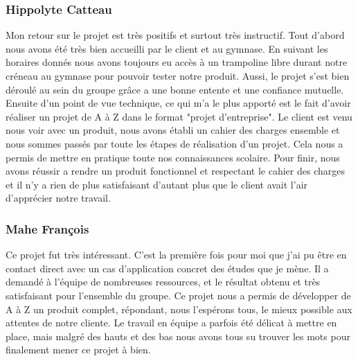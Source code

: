 \subsubsection*{Hippolyte Catteau}
Mon retour sur le projet est très positifs et surtout très instructif. Tout d'abord nous avons été très bien accueilli par le client et au gymnase. En suivant les horaires donnés nous avons toujours eu accès à un trampoline libre durant notre créneau au gymnase pour pouvoir tester notre produit. Aussi, le projet s'est bien déroulé au sein du groupe grâce a une bonne entente et une confiance mutuelle.
Ensuite d'un point de vue technique, ce qui m'a le plus apporté est le fait d'avoir réaliser un projet de A à Z dans le format "projet d'entreprise". Le client est venu nous voir avec un produit, nous avons établi un cahier des charges ensemble et nous sommes passés par toute les étapes de réalisation d'un projet. Cela nous a permis de mettre en pratique toute nos connaissances scolaire.
Pour finir, nous avons réussir a rendre un produit fonctionnel et respectant le cahier des charges et il n'y a rien de plus satisfaisant d'autant plus que le client avait l'air d'apprécier notre travail.

\subsubsection*{Mahe François}
Ce projet fut très intéressant. C’est la première fois pour moi que j’ai pu être en contact direct avec un cas d’application concret des études que je mène. Il a demandé à l’équipe de nombreuses ressources, et le résultat obtenu et très satisfaisant pour l’ensemble du groupe. Ce projet nous a permis de développer de A à Z un produit complet, répondant, nous l’espérons tous, le mieux possible aux attentes de notre cliente. Le travail en équipe a parfois été délicat à mettre en place, mais malgré des hauts et des bas nous avons tous su trouver les mots pour finalement mener ce projet à bien.